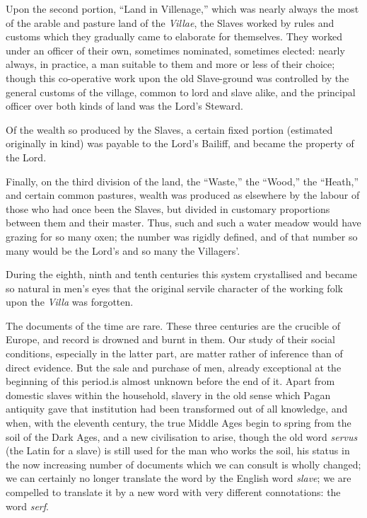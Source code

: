 \documentclass{book}
\begin{document}
Upon the second portion, “Land in Villenage,” which was nearly always the most of the arable and pasture land of the \emph{Villae}, the Slaves worked by rules and customs which they gradually came to elaborate for themselves. They worked under an officer of their own, sometimes nominated, sometimes elected: nearly always, in practice, a man suitable to them and more or less of their choice; though this co-operative work upon the old Slave-ground was controlled by the general customs of the village, common to lord and slave alike, and the principal officer over both kinds of land was the Lord’s Steward.

Of the wealth so produced by the Slaves, a certain fixed portion (estimated originally in kind) was payable to the Lord’s Bailiff, and became the property of the Lord.

Finally, on the third division of the land, the “Waste,” the “Wood,” the “Heath,” and certain common pastures, wealth was produced as elsewhere by the labour of those who had once been the Slaves, but divided in customary proportions between them and their master. Thus, such and such a water meadow would have grazing for so many oxen; the number was rigidly defined, and of that number so many would be the Lord’s and so many the Villagers’.

During the eighth, ninth and tenth centuries this system crystallised and became so natural in men’s eyes that the original servile character of the working folk upon the \emph{Villa} was forgotten.

The documents of the time are rare. These three centuries are the crucible of Europe, and record is drowned and burnt in them. Our study of their social conditions, especially in the latter part, are matter rather of inference than of direct evidence. But the sale and purchase of men, already exceptional at the beginning of this period.is almost unknown before the end of it. Apart from domestic slaves within the household, slavery in the old sense which Pagan antiquity gave that institution had been transformed out of all knowledge, and when, with the eleventh century, the true Middle Ages begin to spring from the soil of the Dark Ages, and a new civilisation to arise, though the old word \emph{servus} (the Latin for a slave) is still used for the man who works the soil, his status in the now increasing number of documents which we can consult is wholly changed; we can certainly no longer translate the word by the English word \emph{slave}; we are compelled to translate it by a new word with very different connotations: the word \emph{serf}.
\end{document}
